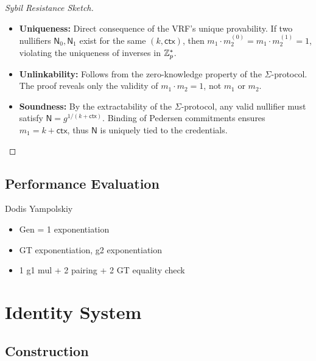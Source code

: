 \begin{proof}[Sybil Resistance Sketch]
\begin{itemize}
    \item \textbf{Uniqueness:} Direct consequence of the VRF’s unique provability. If two nullifiers $\textsf{N}_0, \textsf{N}_1$ exist for the same $(k, \textsf{ctx})$, then $m_1 \cdot m_2^{(0)} = m_1 \cdot m_2^{(1)} = 1$, violating the uniqueness of inverses in $\mathbb{Z}_p^*$.
    
    \item \textbf{Unlinkability:} Follows from the zero-knowledge property of the $\Sigma$-protocol. The proof reveals only the validity of $m_1 \cdot m_2 = 1$, not $m_1$ or $m_2$.
    
    \item \textbf{Soundness:} By the extractability of the $\Sigma$-protocol, any valid nullifier must satisfy $\textsf{N} = g^{1/(k + \textsf{ctx})}$. Binding of Pedersen commitments ensures $m_1 = k + \textsf{ctx}$, thus $\textsf{N}$ is uniquely tied to the credentials.
\end{itemize}
\end{proof}


\subsection{Performance Evaluation}

Dodis Yampolskiy
\begin{itemize}
    \item Gen = 1 exponentiation 
    \item GT exponentiation, g2 exponentiation 
    \item 1 g1 mul + 2 pairing + 2 GT equality check
\end{itemize}








\section{Identity System}


\subsection{Construction}

